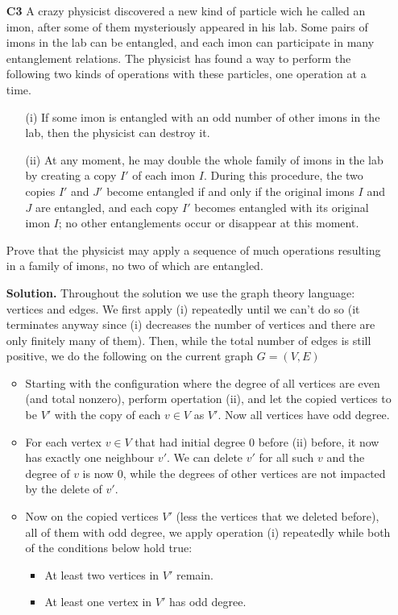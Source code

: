 \documentclass[11pt,a4paper]{article}
\begin{document}
\begin{enumerate}
	\item [\textbf{C3}] A crazy physicist discovered a new kind of particle wich he called an imon, after some of them mysteriously appeared in his lab. Some pairs of imons in the lab can be entangled, and each imon can participate in many entanglement relations. The physicist has found a way to perform the following two kinds of operations with these particles, one operation at a time.
	\begin{enumerate}
		\item [(i)] If some imon is entangled with an odd number of other imons in the lab, then the physicist can destroy it.
		\item [(ii)] At any moment, he may double the whole family of imons in the lab by creating a copy $I'$ of each imon $I$. During this procedure, the two copies $I'$ and $J'$ become entangled if and only if the original imons $I$ and $J$ are entangled, and each copy $I'$ becomes entangled with its original imon $I$; no other entanglements occur or disappear at this moment.
	\end{enumerate}
	Prove that the physicist may apply a sequence of much operations resulting in a family of imons, no two of which are entangled.
	
	\textbf{Solution.} Throughout the solution we use the graph theory language: vertices and edges. We first apply (i) repeatedly until we can't do so (it terminates anyway since (i) decreases the number of vertices and there are only finitely many of them). Then, while the total number of edges is still positive, we do the following on the current graph $G=(V, E)$
	\begin{itemize}
		\item Starting with the configuration where the degree of all vertices are even (and total nonzero), perform opertation (ii), and let the copied vertices to be $V'$ with the copy of each $v\in V$ as $V'$. Now all vertices have odd degree. 
		
		\item For each vertex $v\in V$ that had initial degree 0 before (ii) before, it now has exactly one neighbour $v'$. We can delete $v'$ for all such $v$ and the degree of $v$ is now 0, while the degrees of other vertices are not impacted by the delete of $v'$. 
		
		\item Now on the copied vertices $V'$ (less the vertices that we deleted before), all of them with odd degree, we apply operation (i) repeatedly while both of the conditions below hold true: 
		\begin{itemize}
			\item At least two vertices in $V'$ remain. 
			\item At least one vertex in $V'$ has odd degree. 
		\end{itemize}
		

\end{itemize}
\end{enumerate}
\end{document}
